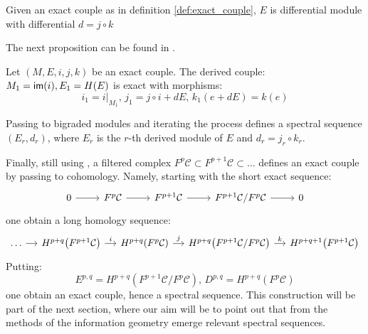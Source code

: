\begin{prop}
\label{prop:differential_module_couple}
Given an exact couple as in definition \ref{def:exact_couple}, $E$ is differential module with differential $d = j \circ k$
\end{prop}
The next proposition can be found in \citep{McCleary_2000}.
\begin{prop}
\label{prop:derived_couple}
Let $(M,E,i,j,k)$ be an exact couple. The derived couple:
$M_1 = \operatorname{\textsf{im}} (i), E_1 = H(E)$ is exact with morphisms: 
\[
i_1 = i\vert_{M_1}, \, j_1 = j \circ i + d E, \, k_1(e + dE) = k(e) 
\]
\end{prop}
Passing to bigraded modules and iterating the process defines a spectral sequence $(E_r,d_r)$, where $E_r$ is the $r$-th derived module of $E$ and $d_r = j_r \circ k_r.$

Finally, still using \citep{McCleary_2000}, a filtered complex $F^p \mathcal{C} \subset F^{p+1} \mathcal{C} \subset \dots $ defines an exact couple by passing to cohomology. Namely, starting with the short exact sequence:
\begin{equation}
    \label{eq:short_exact}
    \begin{tikzcd}
    0 \ar[r] & F^p \mathcal{C} \ar[r] & F^{p+1}\mathcal{C} \ar[r] & F^{p+1}\mathcal{C}/F^p\mathcal{C} \ar[r] & 0
    \end{tikzcd}
\end{equation}
one obtain a long homology sequence:
\begin{equation}
    \label{eq:long_homology}
    \begin{tikzcd}[column sep=small]
    \dots \ar[r] & H^{p+q}\left(F^{p+1} \mathcal{C}\right) \ar[r,"i"] & H^{p+q}\left(F^{p}\mathcal{C}\right) \ar[r,"j"] & H^{p+q}\left(F^{p+1}\mathcal{C}/F^p\mathcal{C}\right) \ar[r,"k"] & H^{p+q+1} \left(F^{p+1} \mathcal{C}\right) 
    \end{tikzcd}
\end{equation}
Putting:
\[
E^{p,q}=H^{p+q}\left(F^{p+1}\mathcal{C}/F^p\mathcal{C}\right), \, D^{p,q} = H^{p+q}\left(F^{p}\mathcal{C}\right)
\]
one obtain an exact couple, hence a spectral sequence. This construction will be part of the next section,  where our aim will be to point out that from the methods of the information geometry emerge relevant spectral sequences.